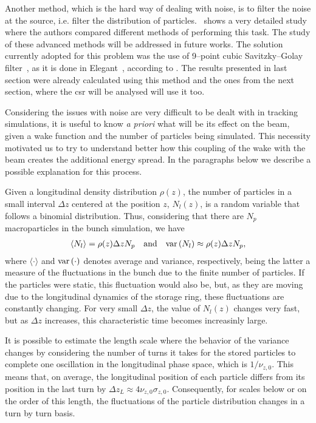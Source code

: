     Another method, which is the hard way of dealing with noise, is to filter the noise at the source, i.e. filter the distribution of particles.~ shows a very detailed study where the authors compared different methods of performing this task. The study of these advanced methods will be addressed in future works. The solution currently adopted for this problem was the use of 9--point cubic Savitzky--Golay filter~\cite{Savitzky1964}, as it is done in Elegant~\cite{Borland2000}, according to . The results presented in last section were already calculated using this method and the ones from the next section, where the \gls{csr} will be analysed will use it too.

    Considering the issues with noise are very difficult to be dealt with in tracking simulations, it is useful to know \emph{a priori} what will be its effect on the beam, given a wake function and the number of particles being simulated. This necessity motivated us to try to understand better how this coupling of the wake with the beam creates the additional energy spread. In the paragraphs below we describe a possible explanation for this process.

    Given a longitudinal density distribution $\rho(z)$, the number of particles in a small interval $\Delta z$ centered at the position $z$, $N_l(z)$, is a random variable that follows a binomial distribution. Thus, considering that there are $N_p$ macroparticles in the bunch simulation, we have
    \begin{align}
        \langle N_l \rangle = \rho(z)\Delta z N_p
        \quad \text{and}\quad
        \text{var}\left(N_l\right) \approx \rho(z)\Delta z N_p,
    \end{align}
    where $\langle\cdot\rangle$ and $\text{var}\left(\cdot\right)$ denotes average and variance, respectively, being the latter a measure of the fluctuations in the bunch due to the finite number of particles. If the particles were static, this fluctuation would also be, but, as they are moving due to the longitudinal dynamics of the storage ring, these fluctuations are constantly changing. For very small $\Delta z$, the value of $N_l(z)$ changes very fast, but as $\Delta z$ increases, this characteristic time becomes increasinly large.

    It is possible to estimate the length scale where the behavior of the variance changes by considering the number of turns it takes for the stored particles to complete one oscillation in the longitudinal phase space, which is $1/\nu_{z,0}$. This means that, on average, the longitudinal position of each particle differs from its position in the last turn by $\Delta z_L \approx 4\nu_{z,0}\sigma_{z,0}$. Consequently, for scales below or on the order of this length, the fluctuations of the particle distribution changes in a turn by turn basis.

